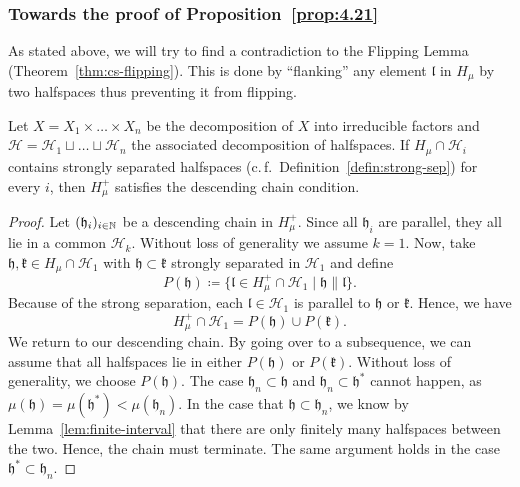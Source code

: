 \subsubsection*{Towards the proof of Proposition~\ref{prop:4.21}}

As stated above, we will try to find a contradiction to the Flipping Lemma (Theorem~\ref{thm:cs-flipping}). This is done by \enquote{flanking} any element \(\mathfrak{l}\) in \(H_\mu\) by two halfspaces thus preventing it from flipping.

\begin{lemma}[{\cite[Lemma~4.18]{MR3509968}}]
  \label{lem:4.18}
  Let \(X = X_1 \times \dots \times X_n\) be the decomposition of \(X\) into irreducible factors and \(\mathcal{H} = \mathcal{H}_1 \sqcup \dots \sqcup \mathcal{H}_n\) the associated decomposition of halfspaces. If \(H_\mu \cap \mathcal{H}_i\) contains strongly separated halfspaces (c.\,f.~Definition~\ref{defin:strong-sep}) for every \(i\), then \(H_\mu^+\) satisfies the descending chain condition.
\end{lemma}

\begin{proof}
  Let \((\mathfrak{h}_i)_{i \in \mathbb{N}}\) be a descending chain in \(H_\mu^+\). Since all \(\mathfrak{h}_i\) are parallel, they all lie in a common \(\mathcal{H}_k\). Without loss of generality we assume \(k=1\). Now, take \(\mathfrak{h, k} \in H_\mu \cap \mathcal{H}_1\) with \(\mathfrak{h} \subset \mathfrak{k}\) strongly separated in \(\mathcal{H}_1\) and define
  \[
    P(\mathfrak{h}) \coloneqq \{\mathfrak{l} \in H_\mu^+ \cap \mathcal{H}_1 \mid \mathfrak{h} \parallel \mathfrak{l}\}.
  \]
  Because of the strong separation, each \(\mathfrak{l} \in \mathcal{H}_1\) is parallel to \(\mathfrak{h}\) or \(\mathfrak{k}\). Hence, we have
  \[
    H_\mu^+ \cap \mathcal{H}_1 = P(\mathfrak{h}) \cup P(\mathfrak{k}).
  \]
  We return to our descending chain. By going over to a subsequence, we can assume that all halfspaces lie in either \(P(\mathfrak{h})\) or \(P(\mathfrak{k})\). Without loss of generality, we choose \(P(\mathfrak{h})\). The case \(\mathfrak{h}_n \subset \mathfrak{h}\) and \(\mathfrak{h}_n \subset \mathfrak{h}^\ast\) cannot happen, as \(\mu(\mathfrak{h}) = \mu(\mathfrak{h}^\ast) < \mu(\mathfrak{h}_n)\). In the case that \(\mathfrak{h} \subset \mathfrak{h}_n\), we know by Lemma~\ref{lem:finite-interval} that there are only finitely many halfspaces between the two. Hence, the chain must terminate. The same argument holds in the case \(\mathfrak{h}^\ast \subset \mathfrak{h}_n\).
\end{proof}


